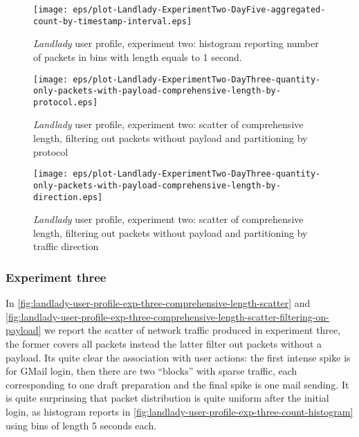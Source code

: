 \documentclass[10pt,a4paper]{article}
\begin{document}
    \begin{figure}
      \centering
      \texttt{[image: eps/plot-Landlady-ExperimentTwo-DayFive-aggregated-count-by-timestamp-interval.eps]}
      \caption{\emph{Landlady} user profile, experiment two: histogram
        reporting number of packets in bins with length equals to 1
        second.}
      \label{fig:landlady-user-profile-exp-two-count-histogram}
    \end{figure}

    \begin{figure}
      \centering
      \texttt{[image: eps/plot-Landlady-ExperimentTwo-DayThree-quantity-only-packets-with-payload-comprehensive-length-by-protocol.eps]}
      \caption{\emph{Landlady} user profile, experiment two: scatter
        of comprehensive length, filtering out packets without payload
        and partitioning by protocol}
      \label{fig:landlady-user-profile-exp-two-comprehensive-length-by-protocol}
    \end{figure}


    \begin{figure}
      \centering
      \texttt{[image: eps/plot-Landlady-ExperimentTwo-DayThree-quantity-only-packets-with-payload-comprehensive-length-by-direction.eps]}
      \caption{\emph{Landlady} user profile, experiment two: scatter
        of comprehensive length, filtering out packets without payload
        and partitioning by traffic direction}
      \label{fig:landlady-user-profile-exp-two-comprehensive-length-by-direction}
    \end{figure}



    \subsubsection*{Experiment three}
    In
    \autoref{fig:landlady-user-profile-exp-three-comprehensive-length-scatter}
    and
    \autoref{fig:landlady-user-profile-exp-three-comprehensive-length-scatter-filtering-on-payload}
    we report the scatter of network traffic produced in experiment
    three, the former covers all packets instead the latter filter out
    packets without a payload. Its quite clear the association with
    user actions: the first intense spike is for GMail login, then
    there are two ``blocks'' with sparse traffic, each corresponding
    to one draft preparation and the final spike is one mail
    sending. It is quite surprinsing that packet distribution is quite
    uniform after the initial login, as histogram reports in
    \autoref{fig:landlady-user-profile-exp-three-count-histogram}
    using bins of length 5 seconds each.
\end{document}
